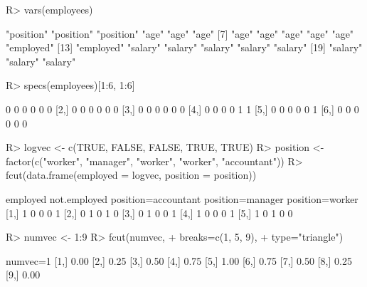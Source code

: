 \documentclass{article}\usepackage[]{graphicx}\usepackage[]{color}
\begin{document}
\begin{Schunk}
% --begin: "lcut.vars"
\begin{Sinput}
R> vars(employees)
\end{Sinput}
\begin{Soutput}
 [1] "position" "position" "position" "age"      "age"      "age"     
 [7] "age"      "age"      "age"      "age"      "age"      "employed"
[13] "employed" "salary"   "salary"   "salary"   "salary"   "salary"  
[19] "salary"   "salary"   "salary"  
\end{Soutput}
%
% --end: "lcut.vars"
\end{Schunk}

\begin{Schunk}
% --begin: "lcut.specs"
\begin{Sinput}
R> specs(employees)[1:6, 1:6]
\end{Sinput}
\begin{Soutput}
     [,1] [,2] [,3] [,4] [,5] [,6]
[1,]    0    0    0    0    0    0
[2,]    0    0    0    0    0    0
[3,]    0    0    0    0    0    0
[4,]    0    0    0    0    1    1
[5,]    0    0    0    0    0    1
[6,]    0    0    0    0    0    0
\end{Soutput}
%
% --end: "lcut.specs"
\end{Schunk}

\begin{Schunk}
% --begin: "fcut.logfact"
\begin{Sinput}
R> logvec <- c(TRUE, FALSE, FALSE, TRUE, TRUE)
R> position <- factor(c("worker", "manager", "worker", "worker", "accountant"))
R> fcut(data.frame(employed = logvec, position = position))
\end{Sinput}
\begin{Soutput}
     employed not.employed position=accountant position=manager position=worker
[1,]        1            0                   0                0               1
[2,]        0            1                   0                1               0
[3,]        0            1                   0                0               1
[4,]        1            0                   0                0               1
[5,]        1            0                   1                0               0
\end{Soutput}
%
% --end: "fcut.logfact"
\end{Schunk}

\begin{Schunk}
% --begin: "fcut.numeric1"
\begin{Sinput}
R> numvec <- 1:9
R> fcut(numvec,
+       breaks=c(1, 5, 9),
+       type="triangle")
\end{Sinput}
\begin{Soutput}
      numvec=1
 [1,]     0.00
 [2,]     0.25
 [3,]     0.50
 [4,]     0.75
 [5,]     1.00
 [6,]     0.75
 [7,]     0.50
 [8,]     0.25
 [9,]     0.00
\end{Soutput}
%
% --end: "fcut.numeric1"
\end{Schunk}
\end{document}
